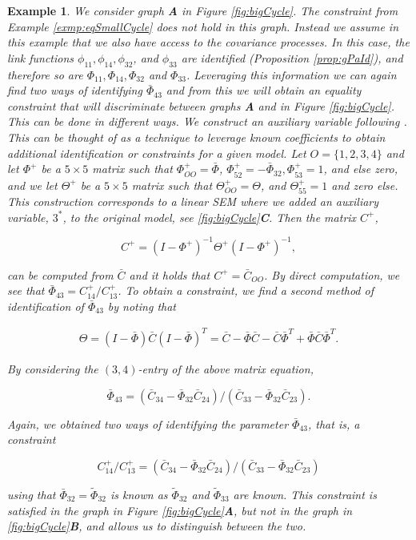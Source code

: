 \documentclass[accepted]{uai2021} %
\newtheorem{exmp}[thm]{Example}
\begin{document}
\begin{exmp}
	
	
	We consider graph \textbf{A} in Figure \ref{fig:bigCycle}. The constraint 
	from Example \ref{exmp:eqSmallCycle} does not hold in this graph. Instead 
	we assume in 
	this example that we also have access to the 
	covariance processes. In this case, the link functions 
	$\phi_{11},\phi_{14},\phi_{32}$, and $\phi_{33}$ are identified 
	(Proposition 
	\ref{prop:gPaId}), and therefore so are $\Phi_{11}, \Phi_{14} , \Phi_{32}$ 
	and 
	$\Phi_{33}$.  Leveraging this information we can again find two ways of 
	identifying 
	$\bar{\Phi}_{43}$ and from this we will obtain an equality constraint that 
	will 
	discriminate between graphs \textbf{A} and  in 
	Figure \ref{fig:bigCycle}. This can be done in different ways. We 
	construct an {\it auxiliary 
	variable} following \cite{chenIJCAI2016, chenICML2017}. This can be thought 
	of as a technique to leverage known coefficients to obtain additional 
	identification or constraints for a given model. Let $O=\{1,2,3,4\}$ and 
	let $\Phi^+$ be a 
	$5\times 5$ 
	matrix such that $\Phi_{OO}^+ = \bar{\Phi}$, $\Phi_{52}^+ = 
	-\bar{\Phi}_{32}, \Phi_{53}^+ 
	= 1$, and else zero, and we let $\Theta^+$ be a $5\times 5$ matrix such 
	that $\Theta_{OO}^+ = \Theta$, and $\Theta_{55}^+ = 1$ and zero else. This 
	construction corresponds to a linear SEM where we added an \emph{auxiliary 
	variable}, $3^*$, to the original model, see \ref{fig:bigCycle}\textbf{C}. 
	Then 
	the matrix $C^+$,
	
	$$
	C^+ = (I - \Phi^+)^{-1}\Theta^+(I-\Phi^+)^{-1},
	$$
	
	can be computed from $\bar{C}$ and it holds that 
	$C^+=\bar{C}_{OO}$. By direct computation, we see that $\bar{\Phi}_{43} = 
	C_{14}^+/C_{13}^+$. To obtain a constraint, we find a second method of 
	identification of $\bar{\Phi}_{43}$ by noting that
	
	\begin{align}
		\Theta = (I - \bar{\Phi})\bar{C}(I-\bar{\Phi})^T = \bar{C} - 
		\bar{\Phi}\bar{C} - \bar{C}\bar{\Phi}^T + 
		\bar{\Phi}\bar{C}\bar{\Phi}^T.
		\label{eq:expandTheta}
	\end{align}

	
	By considering the $(3,4)$-entry of the above matrix equation,
	
	$$
	\bar{\Phi}_{43} = (\bar{C}_{34} - 
	\bar{\Phi}_{32}\bar{C}_{24})/(\bar{C}_{33} - 
	\bar{\Phi}_{32}\bar{C}_{23}).
	$$
	
 Again, we obtained two ways of identifying 
 the parameter $\bar{\Phi}_{43}$, that is, a constraint
 
 $$
 C_{14}^+/C_{13}^+ = (\bar{C}_{34} - 
 \bar{\Phi}_{32}\bar{C}_{24})/(\bar{C}_{33} - 
 \bar{\Phi}_{32}\bar{C}_{23})
 $$
 
 using that $\bar{\Phi}_{32} = \tilde{\Phi}_{32}$ is known as 
 $\tilde{\Phi}_{32}$ and 
 $\tilde{\Phi}_{33}$ are known. This constraint is satisfied in the graph in 
 Figure
 \ref{fig:bigCycle}\textbf{A}, 
 but not in the graph in \ref{fig:bigCycle}\textbf{B}, and allows us to 
 distinguish between 
 the two.
 
 \label{exmp:eqBigCycle}
\end{exmp}
\end{document}
